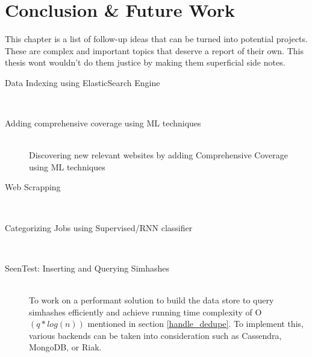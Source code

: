 \chapter{Conclusion \& Future Work}
This chapter is a list of follow-up ideas that can be turned into potential projects. These are complex and
important topics that deserve a report of their own. This thesis wont wouldn't do them justice by making
them superficial side notes.

\begin{description}
  \item[Data Indexing using ElasticSearch Engine] \hfill \\

  \item[Adding comprehensive coverage using ML techniques] \hfill \\
    Discovering new relevant websites by adding Comprehensive Coverage using ML techniques
  \item[Web Scrapping] \hfill \\
    \cite{contentExtract}
  \item[Categorizing Jobs using Supervised/RNN classifier] \hfill \\
  \item[SeenTest: Inserting and Querying Simhashes] \hfill \\
    To work on a performant solution to build the data store to query simhashes efficiently and achieve
    running time complexity of O$(q * log(n))$ mentioned in section \ref{handle_dedupe}. To implement
    this, various backends can be taken into consideration such as Cassendra, MongoDB, or Riak.
    
\end{description}

\pagebreak